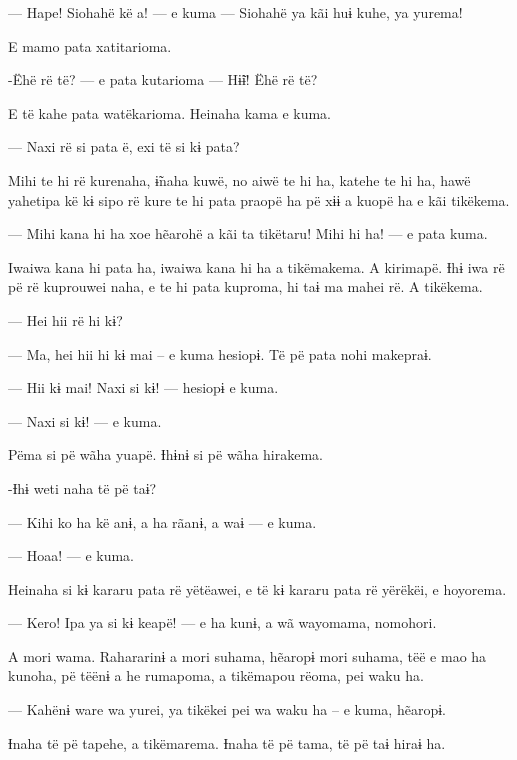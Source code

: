 --- Hape! Siohahë kë a! --- e kuma --- Siohahë ya kãi huɨ kuhe, ya yurema! 

E mamo pata xatitarioma. 

-Ëhë rë të? --- e pata kutarioma --- Hɨ̃ɨ! Ëhë rë të? 


E të kahe pata watëkarioma. Heinaha kama e kuma. 


--- Naxi rë si pata ë, exi të si kɨ pata? 

Mihi te hi rë kurenaha, ɨ̃naha kuwë, no aiwë te hi ha, katehe te hi ha,
hawë yahetipa kë kɨ sipo rë kure te hi pata praopë ha pë xɨɨ a kuopë ha
e kãi tikëkema. 

--- Mihi kana hi ha xoe hẽarohë a kãi ta tikëtaru! Mihi hi ha! --- e pata
kuma. 

Iwaiwa kana hi pata ha, iwaiwa kana hi ha a tikëmakema. A kirimapë. Ɨhɨ
iwa rë pë rë kuprouwei naha, e te hi pata kuproma, hi taɨ ma mahei rë. A tikëkema. 

--- Hei hii rë hi kɨ? 

--- Ma, hei hii hi kɨ mai -- e kuma hesiopɨ. Të pë pata nohi makepraɨ. 

--- Hii kɨ mai! Naxi si kɨ! --- hesiopɨ e kuma. 

--- Naxi si kɨ! --- e kuma. 

Pëma si pë wãha yuapë. Ɨhɨnɨ si pë wãha hirakema. 

-Ɨhɨ weti naha të pë taɨ? 

--- Kihi ko ha kë anɨ, a ha rãanɨ, a waɨ --- e kuma. 

--- Hoaa! --- e kuma. 

Heinaha si kɨ kararu pata rë yëtëawei, e të kɨ kararu pata rë yërëkëi, e
hoyorema. 

--- Kero! Ipa ya si kɨ keapë! --- e ha kunɨ, a wã wayomama, nomohori. 

A mori wama. Rahararinɨ a mori suhama, hẽaropɨ mori suhama, tëë e mao ha
kunoha, pë tëënɨ a he rumapoma, a tikëmapou rëoma, pei waku ha. 

--- Kahënɨ ware wa yurei, ya tikëkei pei wa waku ha -- e kuma, hẽaropɨ.

Ɨnaha të pë tapehe, a tikëmarema. Ɨnaha të pë tama, të pë taɨ hiraɨ ha. 

